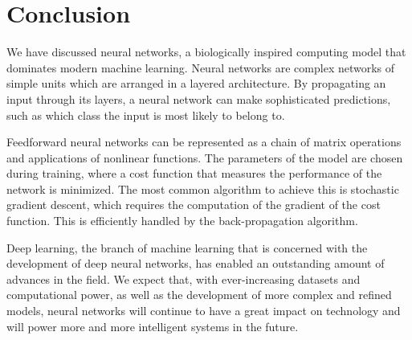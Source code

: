\section{Conclusion}
\label{sec:conclusion}
We have discussed neural networks, a biologically inspired computing model that dominates modern machine learning. Neural networks are complex networks of simple units which are arranged in a layered architecture. By propagating an input through its layers, a neural network can make sophisticated predictions, such as which class the input is most likely to belong to.

Feedforward neural networks can be represented as a chain of matrix operations and applications of nonlinear functions. The parameters of the model are chosen during training, where a cost function that measures the performance of the network is minimized. The most common algorithm to achieve this is stochastic gradient descent, which requires the computation of the gradient of the cost function. This is efficiently handled by the back-propagation algorithm.

Deep learning, the branch of machine learning that is concerned with the development of deep neural networks, has enabled an outstanding amount of advances in the field. We expect that, with ever-increasing datasets and computational power, as well as the development of more complex and refined models, neural networks will continue to have a great impact on technology and will power more and more intelligent systems in the future.